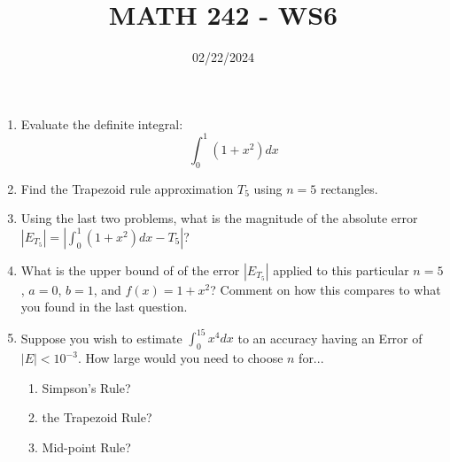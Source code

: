\documentclass[12pt]{article}
\title{MATH 242 - WS6}
\date{02/22/2024}
\begin{document}
\maketitle


\begin{enumerate}

\item Evaluate the definite integral:
$$\int_0^1(1+x^2)dx$$
\vfill
\item Find the Trapezoid rule approximation $T_5$ using $n=5$ rectangles.
\vfill
\newpage
\item Using the last two problems, what is the magnitude of the absolute error $|E_{T_5}|=|\int_0^1(1+x^2)dx-T_5|$?
\vfill
\item What is the upper bound of of the error $|E_{T_5}|$ applied to this particular $n=5$, $a=0$, $b=1$, and $f(x)=1+x^2$? Comment on how this compares to what you found in the last question.
\vfill
\newpage
\item Suppose you wish to estimate $\int_0^15x^4dx$ to an accuracy having an Error  of $|E|<10^{-3}$. How large would you need to choose $n$ for...
\begin{enumerate}
    \item Simpson's Rule?
    \item the Trapezoid Rule?
    \item Mid-point Rule?
\end{enumerate}

\end{enumerate}
\end{document}
